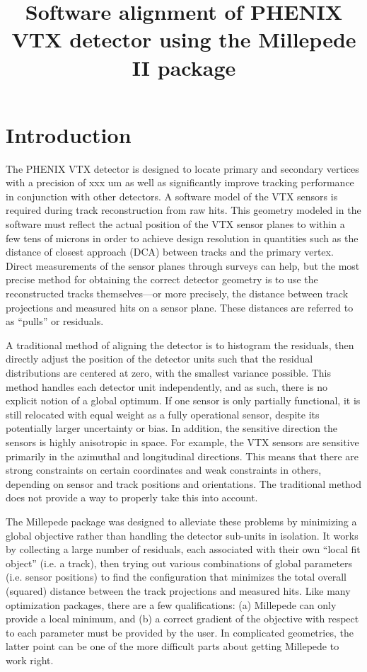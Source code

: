 \documentclass[12pt]{article}
\title{\sffamily\bfseries{Software alignment of PHENIX VTX detector using the Millepede II package}}
\author{\sffamily{Andrew Adare, Darren McGlinchey, Jin Huang, Jamie Nagle}}
\date{\sffamily{\today}}
\begin{document}
\maketitle
\section{Introduction}
The PHENIX VTX detector is designed to locate primary and secondary vertices with a precision of xxx um as well as significantly improve tracking performance in conjunction with other detectors. A software model of the VTX sensors is required during track reconstruction from raw hits. This geometry modeled in the software must reflect the actual position of the VTX sensor planes to within a few tens of microns in order to achieve design resolution in quantities such as the distance of closest approach (DCA) between tracks and the primary vertex. Direct measurements of the sensor planes through surveys can help, but the most precise method for obtaining the correct detector geometry is to use the reconstructed tracks themselves---or more precisely, the distance between track projections and measured hits on a sensor plane. These distances are referred to as ``pulls'' or residuals.

A traditional method of aligning the detector is to histogram the residuals, then directly adjust the position of the detector units such that the residual distributions are centered at zero, with the smallest variance possible. This method handles each detector unit independently, and as such, there is no explicit notion of a global optimum. If one sensor is only partially functional, it is still relocated with equal weight as a fully operational sensor, despite its potentially larger uncertainty or bias. In addition, the sensitive direction the sensors is highly anisotropic in space. For example, the VTX sensors are sensitive primarily in the azimuthal and longitudinal directions. This means that there are strong constraints on certain coordinates and weak constraints in others, depending on sensor and track positions and orientations. The traditional method does not provide a way to properly take this into account.

The Millepede package was designed to alleviate these problems by minimizing a global objective rather than handling the detector sub-units in isolation. It works by collecting a large number of residuals, each associated with their own ``local fit object'' (i.e. a track), then trying out various combinations of global parameters (i.e. sensor positions) to find the configuration that minimizes the total overall (squared) distance between the track projections and measured hits. Like many optimization packages, there are a few qualifications: (a) Millepede can only provide a local minimum, and (b) a correct gradient of the objective with respect to each parameter must be provided by the user. In complicated geometries, the latter point can be one of the more difficult parts about getting Millepede to work right.
\end{document}
